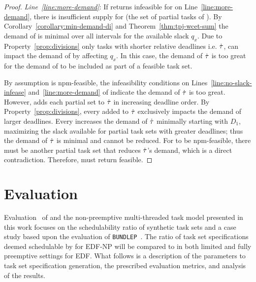 \documentclass[a4paper,UKenglish,cleveref,autoref,english]{lipics-v2019}
\newcommand{\bundlep}{\texttt{BUNDLEP}}
\begin{document}
\begin{theorem}
\begin{proof}
    \emph{Line~\ref{line:more-demand}}: If \tpj{} returns infeasible
    for \ants{} on Line~\ref{line:more-demand}, there is insufficient
    supply for  (the set of partial tasks of ). By
    Corollary~\ref{corollary:min-demand-di} and
    Theorem~\ref{thm:tpj-wcet-sum} the demand of  is
    minimal over all intervals for the available slack ${q_x}$. Due to
    Property~\ref{prop:divisions} only tasks with shorter relative
    deadlines i.e. ${\dot{\tau{}}}$, can impact the demand of
     by affecting ${q_x}$. In this case, the demand of
    ${\dot{\tau{}}}$ is too great for the demand of  to
    be included as part of a feasible task set.

    By assumption \ants{} is npm-feasible, the infeasibility
    conditions on Lines~\ref{line:no-slack-infease}
    and~\ref{line:more-demand} of \tpj{} indicate the demand of 
    ${\dot{\tau{}}}$ is too great. However, \tpj{} adds each
    partial set  to ${\dot{\tau{}}}$ in increasing
    deadline order. By Property~\ref{prop:divisions}, every 
     added to ${\dot{\tau{}}}$ exclusively impacts the
    demand of larger deadlines. Every  increases the demand of
    ${\dot{\tau{}}}$ minimally starting with ${D_1}$, maximizing the
    slack available for partial task sets with greater deadlines; thus
    the demand of ${\dot{\tau{}}}$ is minimal and cannot be
    reduced. For \ants{} to be npm-feasible, there must be another
    partial task set that reduces ${\dot{\tau{}}}$'s demand,
    which is a direct contradiction. Therefore, \tpj{} must return
    feasible.
  \end{proof}
\end{theorem}

\section{Evaluation}\label{sec:eval}

Evaluation~\cite{NPM-Artifact:2019} of \tpj{} and the non-preemptive
multi-threaded task model presented in this work focuses on the
schedulability ratio of synthetic task sets and a case study based
upon the evaluation of \bundlep{}~\cite{Tessler:2018b}. The ratio of
task set specifications deemed schedulable by \tpj{} for EDF-NP will
be compared to \npchunks{} in both limited and fully preemptive
settings for EDF. What follows is a description of the parameters to
task set specification generation, the prescribed evaluation metrics,
and analysis of the results. 
\end{document}
